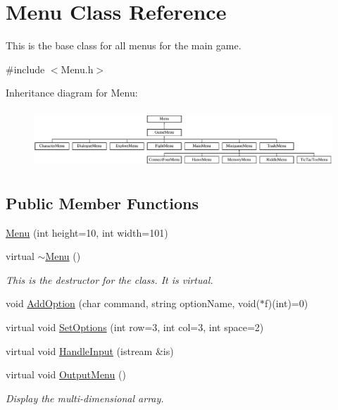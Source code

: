 \hypertarget{classMenu}{\section{Menu Class Reference}
\label{classMenu}
}


This is the base class for all menus for the main game.  




{\ttfamily \#include $<$Menu.\-h$>$}

Inheritance diagram for Menu\-:\begin{figure}[H]
\begin{center}
\leavevmode
\includegraphics[height=2.222222cm]{classMenu}
\end{center}
\end{figure}
\subsection*{Public Member Functions}
\begin{DoxyCompactItemize}
\item 
\hyperlink{classMenu_a28ea9cee39d242905df93e6baa1544ea}{Menu} (int height=10, int width=101)
\item 
virtual \hyperlink{classMenu_a831387f51358cfb88cd018e1777bc980}{$\sim$\-Menu} ()
\begin{DoxyCompactList}\small\item\em This is the destructor for the class. It is virtual. \end{DoxyCompactList}\item 
void \hyperlink{classMenu_a3cf7c25cc9c1b45664a2f68da25b9373}{Add\-Option} (char command, string option\-Name, void($\ast$f)(int)=0)
\item 
virtual void \hyperlink{classMenu_acc31e14c9ed4dd2fb5dc4319738bafba}{Set\-Options} (int row=3, int col=3, int space=2)
\item 
virtual void \hyperlink{classMenu_aebc8f6c5b80202603b45da16dc978706}{Handle\-Input} (istream \&is)
\item 
virtual void \hyperlink{classMenu_a4665a914fe24a8b11d8d6c95792184b3}{Output\-Menu} ()
\begin{DoxyCompactList}\small\item\em Display the multi-\/dimensional array. \end{DoxyCompactList}\end{DoxyCompactItemize}
